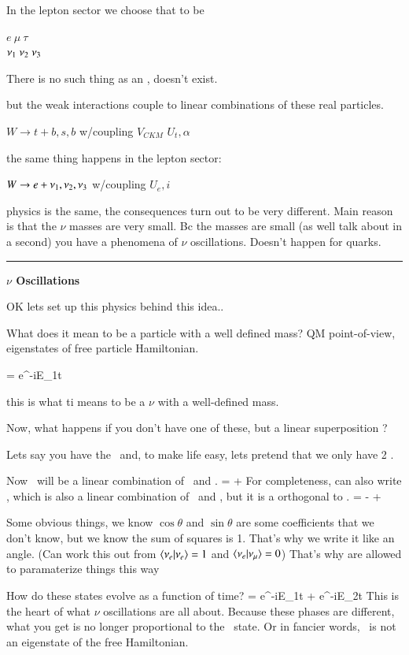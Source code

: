{In the lepton sector we choose that to be 

$e\ \mu\ \tau$ \\
$\nu_1\ \nu_2\ \nu_3 $

There is no such thing as an \nue, doesn't exist. 

but the weak interactions couple to linear combinations of these real particles.  

$W \rightarrow t + b,s,b$ w/coupling $V_{CKM}$  $U_t,\alpha$

the same thing happens in the lepton sector:


$W \rightarrow e + \nu_1,\nu_2,\nu_3$ w/coupling $U_e,i$

physics is the same,  the consequences turn out to be very different.  
Main reason is that the $\nu$ masses  are very small. 
Bc the masses are small (as well talk about in a second) you have a phenomena of $\nu$ oscillations.
Doesn't happen for quarks. 

\noindent\rule{\textwidth}{1pt}

\textbf{$\nu$ Oscillations}

OK lets set up this physics behind this idea.. 

What does it mean to be a particle with a well defined mass?
QM point-of-view, eigenstates of free particle Hamiltonian. 

\be
\ket{\nuone} =  e^{-iE_1t} \ket{\nuone}
\ee

this is what ti means to be a $\nu$ with a well-defined mass.

Now, what happens if you don't have one of these, but a linear superposition  ?

Lets say you have the \nue\ and, to make life easy, lets pretend that we only have 2 \nus. 

Now \nue\ will be a linear combination of \nuone\ and \nutwo. 
\be
\ket{\nue} = \cos\theta \ket{\nuone} + \sin\theta \ket{\nutwo}
\ee
For completeness, can also write \numu, which is also a linear combination of \nuone\ and \nutwo, but it is a orthogonal to \nue.
\be
\ket{\numu} = -\sin\theta \ket{\nuone} + \cos\theta \ket{\nutwo}
\ee


Some obvious things, we know $\cos\theta$ and $\sin\theta$ are some coefficients that we don't know, but we know the sum of squares is 1. 
That's why we write it like an angle.
(Can work this out from  $\braket{\nu_e | \nu_e}  = 1$ and $\braket{\nu_e | \nu_\mu}  = 0$)
That's why are allowed to paramaterize things this way

How do these states evolve as a function of time?
\be
{} = \cos\theta e^{-iE_1t} \ket{\nuone} + \sin\theta e^{-iE_2t}\ket{\nutwo}
\ee
This is the heart of what $\nu$ oscillations are all about. 
Because these phases are different, what you get is no longer proportional to the \nue\ state.
Or in fancier words, \nue\ is not an eigenstate of the free Hamiltonian.

}
